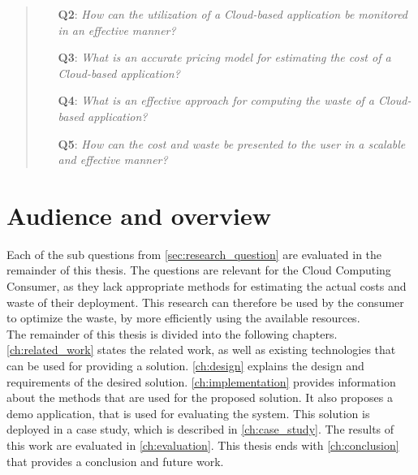 \begin{quote}
    \begin{itemize}
        \item[\textbf{Q2}: ]\textit{How can the utilization of a Cloud-based application be monitored in an effective manner?}
        \item[\textbf{Q3}: ]\textit{What is an accurate pricing model for estimating the cost of a Cloud-based application?}
        \item[\textbf{Q4}: ]\textit{What is an effective approach for computing the waste of a Cloud-based application?}
        \item[\textbf{Q5}: ]\textit{How can the cost and waste be presented to the user in a scalable and effective manner?}
    \end{itemize}
\end{quote}

\section{Audience and overview} \label{sec:audience}
Each of the sub questions from \autoref{sec:research_question} are evaluated in the remainder of this thesis. The questions are relevant for the Cloud Computing Consumer, as they lack appropriate methods for estimating the actual costs and waste of their deployment. This research can therefore be used by the consumer to optimize the waste, by more efficiently using the available resources. \\

\noindent
The remainder of this thesis is divided into the following chapters. \autoref{ch:related_work} states the related work, as well as existing technologies that can be used for providing a solution. \autoref{ch:design} explains the design and requirements of the desired solution. \autoref{ch:implementation} provides information about the methods that are used for the proposed solution. It also proposes a demo application, that is used for evaluating the system. This solution is deployed in a case study, which is described in \autoref{ch:case_study}.
The results of this work are evaluated in \autoref{ch:evaluation}. This thesis ends with \autoref{ch:conclusion} that provides a conclusion and future work.